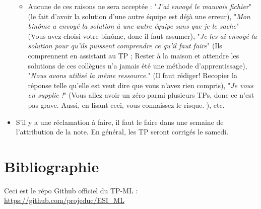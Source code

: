 \documentclass[11pt, a4paper]{article}
\begin{document}
\begin{itemize}
\begin{itemize}
		\item Aucune de ces raisons ne sera acceptée : "\textit{J'ai envoyé le mauvais fichier}" (le fait d'avoir la solution d'une autre équipe est déjà une erreur), "\textit{Mon binôme a envoyé la solution à une autre équipe sans que je le sache}" (Vous avez choisi votre binôme, donc il faut assumer), "\textit{Je les ai envoyé la solution pour qu'ils puissent comprendre ce qu'il faut faire}" (Ils comprennent en assistant au TP ; Rester à la maison et attendre les solutions de ces collègues n'a jamais été une méthode d'apprentissage), "\textit{Nous avons utilisé la même ressource.}" (Il faut rédiger! Recopier la réponse telle qu'elle est veut dire que vous n'avez rien compris), "\textit{Je vous en supplie !}" (Vous allez avoir un zéro parmi plusieurs TPs, donc ce n'est pas grave. Aussi, en lisant ceci, vous connaissez le risque. ), etc.
	\end{itemize}
	\item S'il y a une réclamation à faire, il faut le faire dans une semaine de l'attribution de la note. 
	En général, les TP seront corrigés le samedi.
	
\end{itemize}

\section{Bibliographie}

Ceci est le répo Github officiel du TP-ML : \url{https://github.com/projeduc/ESI_ML}

\nocite{*}




\end{document}
